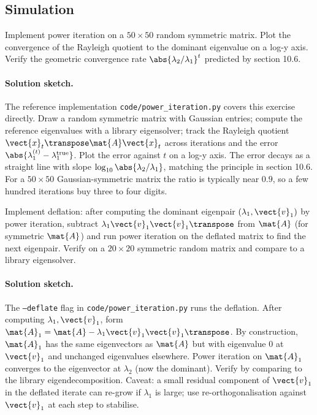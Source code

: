 \subsection*{Simulation}

\begin{exercise}
Implement power iteration on a $50 \times 50$ random symmetric
matrix. Plot the convergence of the Rayleigh quotient to the
dominant eigenvalue on a log-y axis. Verify the geometric
convergence rate $\abs{\lambda_{2}/\lambda_{1}}^{t}$ predicted by
section 10.6.
\end{exercise}

\paragraph{Solution sketch.}
The reference implementation \texttt{code/power\_iteration.py}
covers this exercise directly. Draw a random symmetric matrix with
Gaussian entries; compute the reference eigenvalues with a library
eigensolver; track the Rayleigh quotient $\vect{x}_{t}\transpose
\mat{A} \vect{x}_{t}$ across iterations and the error
$\abs{\lambda_{1}^{(t)} - \lambda_{1}^{\text{true}}}$. Plot the
error against $t$ on a log-y axis. The error decays as a straight
line with slope $\log_{10}\abs{\lambda_{2}/\lambda_{1}}$, matching
the principle in section 10.6. For a $50 \times 50$ Gaussian-symmetric
matrix the ratio is typically near $0.9$, so a few hundred iterations
buy three to four digits.

\begin{exercise}
Implement deflation: after computing the dominant eigenpair
$(\lambda_{1}, \vect{v}_{1})$ by power iteration, subtract
$\lambda_{1} \vect{v}_{1} \vect{v}_{1}\transpose$ from $\mat{A}$
(for symmetric $\mat{A}$) and run power iteration on the deflated
matrix to find the next eigenpair. Verify on a $20 \times 20$
symmetric random matrix and compare to a library eigensolver.
\end{exercise}

\paragraph{Solution sketch.}
The \texttt{--deflate} flag in \texttt{code/power\_iteration.py}
runs the deflation. After computing $\lambda_{1}, \vect{v}_{1}$,
form $\mat{A}_{1} = \mat{A} - \lambda_{1} \vect{v}_{1}
\vect{v}_{1}\transpose$. By construction, $\mat{A}_{1}$ has the
same eigenvectors as $\mat{A}$ but with eigenvalue $0$ at
$\vect{v}_{1}$ and unchanged eigenvalues elsewhere. Power iteration
on $\mat{A}_{1}$ converges to the eigenvector at $\lambda_{2}$
(now the dominant). Verify by comparing to the library
eigendecomposition. Caveat: a small residual component of
$\vect{v}_{1}$ in the deflated iterate can re-grow if $\lambda_{1}$
is large; use re-orthogonalisation against $\vect{v}_{1}$ at each
step to stabilise.

